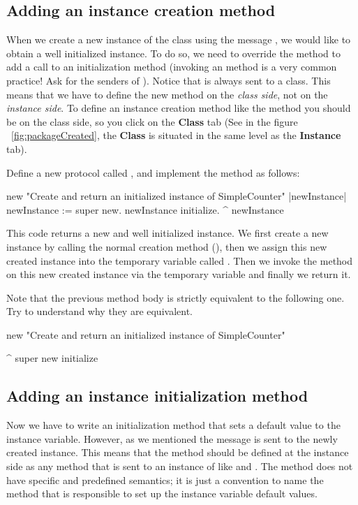 \subsection*{Adding an instance creation method}
When we create a new instance of the class 
using the message , we would like to obtain a well
initialized instance. To do so, we need to override the method
 to add a call to an initialization method (invoking an
 method is a very common practice! Ask for the
senders of ). Notice that  is always sent
to a class. This means that we have to define the new method on the
\emph{class side}, not on the \emph{instance side}. To define an instance creation method like the method
 you should be on the class side, so you click on the
\textbf{Class} tab (See in the figure ~\ref{fig:packageCreated},
the \textbf{Class} is situated in the same level as the
\textbf{Instance} tab).

\exercise Define a new protocol called , and
implement the method  as follows:

\begin{code}
new
   "Create and return an initialized instance of SimpleCounter"
   |newInstance|
   newInstance := super new.
   newInstance initialize.
   ^ newInstance
\end{code}

This code returns a new and well initialized instance. We first
create a new instance by calling the normal creation method
(), then we assign this new created instance
into the temporary variable called . Then we
invoke the  method on this new created instance
via the temporary variable and finally we return it.

Note that the previous method body is strictly equivalent to
the following one. Try to understand why they are equivalent.

\begin{code}
new
   "Create and return an initialized instance of SimpleCounter"

   ^ super new initialize
\end{code}

\subsection*{Adding an instance initialization method}
Now we have to write an initialization method that sets a default
value to the  instance variable. However, as
we mentioned the  message is sent to the newly
created instance. This means that the  method
should be defined at the instance side as any method that is sent
to an instance of  like 
and . The  method does not
have specific and predefined semantics; it is just a convention to
name the method that is responsible to set up the instance
variable default values.

